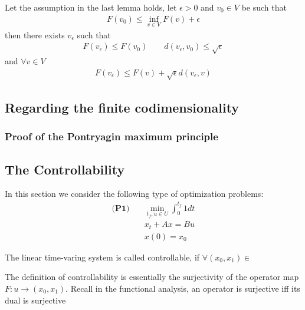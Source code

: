 \begin{lemma}	
\end{lemma}

\begin{corollary}
	Let the assumption in the last lemma holds, let $\epsilon >0$ and $v_0 \in V$ be such that 
	\begin{align*}
		F(v_0) \le \inf_{v \in V} F(v) + \epsilon
	\end{align*}
	then there exists $v_\epsilon$ such that 
	\begin{align*}
		F(v_\epsilon) \le F(v_0) \qquad d(v_\epsilon, v_0) \le \sqrt{\epsilon}
	\end{align*}
	and $\forall v \in V$
	\begin{align*}
		F(v_\epsilon) \le F(v) + \sqrt{\epsilon} d(v_\epsilon, v)
	\end{align*}
\end{corollary}


\subsection{Regarding the finite codimensionality}

\subsubsection*{Proof of the Pontryagin maximum principle}




\subsection{The Controllability}
In this section we consider the following type of optimization problems:
\begin{align*}
\textbf{(P1)} \quad
	&\min_{t_f, u \in U} \int_0^{t_f} 1 dt \\ 
	& x_t + Ax = Bu\\
	& x(0) = x_0
\end{align*}

\begin{definition}
	The linear time-varing system is called controllable, if $\forall (x_0, x_1) \in  $
\end{definition}

The definition of controllability is essentially the surjectivity of the operator map $ F:u \rightarrow (x_0, x_1)$. Recall in the functional analysis, an operator is surjective iff its dual is surjective


